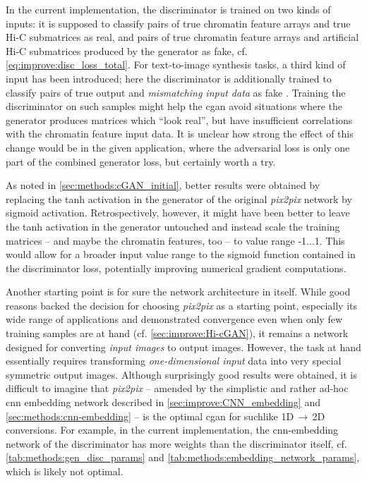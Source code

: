 In the current implementation, the discriminator is trained on two kinds of inputs:
it is supposed to classify pairs of true chromatin feature arrays and true Hi-C submatrices as real, 
and pairs of true chromatin feature arrays and artificial Hi-C submatrices produced by the generator as fake, cf. \cref{eq:improve:disc_loss_total}.
For text-to-image synthesis tasks, a third kind of input has been introduced; here the discriminator is additionally trained 
to classify pairs of true output and \emph{mismatching input data} as fake \cite{Reed2016}.
Training the discriminator on such samples might help the \acrshort{cgan} avoid situations 
where the generator produces matrices which ``look real'', 
but have insufficient correlations with the chromatin feature input data.
It is unclear how strong the effect of this change would be in the given application, 
where the adversarial loss is only one part of the combined generator loss, but certainly worth a try.

As noted in \cref{sec:methods:cGAN_initial}, better results were obtained by replacing the tanh activation in the generator 
of the original \emph{pix2pix} network by sigmoid activation.
Retrospectively, however, it might have been better to leave the tanh activation in the generator untouched
and instead scale the training matrices -- and maybe the chromatin features, too -- to value range -1...1.
This would allow for a broader input value range to the sigmoid function contained in the discriminator loss,
potentially improving numerical gradient computations.

Another starting point is for sure the network architecture in itself.
While good reasons backed the decision for choosing \emph{pix2pix} as a starting point,
especially its wide range of applications and demonstrated convergence even when only few training 
samples are at hand \cite{Isola2017} (cf. \cref{sec:improve:Hi-cGAN}),
it remains a network designed for converting \emph{input images} to output images.
However, the task at hand essentially requires transforming \emph{one-dimensional input} data into very special symmetric output images.
Although surprisingly good results were obtained, it is difficult to imagine that \emph{pix2pix} -- amended by the simplistic and rather ad-hoc \acrshort{cnn} embedding network 
described in \cref{sec:improve:CNN_embedding} and \ref{sec:methods:cnn-embedding} -- is the optimal \acrshort{cgan} for suchlike 1D\,$\rightarrow$\,2D conversions.
For example, in the current implementation, the \acrshort{cnn}-embedding network of the discriminator has more weights than the discriminator itself, 
cf. \cref{tab:methods:gen_disc_params} and \ref{tab:methods:embedding_network_params}, which is likely not optimal.

